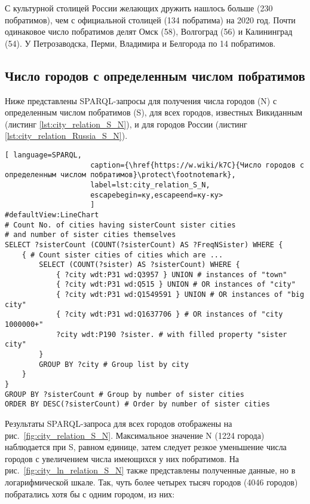 С культурной столицей России желающих дружить нашлось больше (230 побратимов), чем с официальной столицей (134 побратима) на 2020 год. Почти одинаковое число побратимов делят Омск (58), Волгоград (56) и Калининград (54). У Петрозаводска, Перми, Владимира и Белгорода по 14 побратимов.

\subsection{Число городов с определенным числом побратимов}

Ниже представлены SPARQL-запросы для получения числа городов (N) с определенным числом побратимов (S), для всех городов, известных Викиданным (листинг \ref{lst:city_relation_S_N}), и для городов России (листинг \ref{lst:city_relation_Russia_S_N}).

\begin{lstlisting}[ language=SPARQL, 
                    caption={\href{https://w.wiki/k7C}{Число городов с определенным числом побратимов}\protect\footnotemark},
                    label=lst:city_relation_S_N, 
                    escapebegin=ку,escapeend=ку-ку>
                    ]
#defaultView:LineChart
# Count No. of cities having sisterCount sister cities 
# and number of sister cities themselves
SELECT ?sisterCount (COUNT(?sisterCount) AS ?FreqNSister) WHERE {                                                                         
	{ # Count sister cities of cities which are ...
		SELECT (COUNT(?sister) AS ?sisterCount) WHERE {        
			{ ?city wdt:P31 wd:Q3957 } UNION # instances of "town"
			{ ?city wdt:P31 wd:Q515 } UNION # OR instances of "city"
			{ ?city wdt:P31 wd:Q1549591 } UNION # OR instances of "big city"
			{ ?city wdt:P31 wd:Q1637706 } # OR instances of "city 1000000+"
			?city wdt:P190 ?sister. # with filled property "sister city"
		}
		GROUP BY ?city # Group list by city
	}
}
GROUP BY ?sisterCount # Group by number of sister cities                                     
ORDER BY DESC(?sisterCount) # Order by number of sister cities   
\end{lstlisting}

Результаты SPARQL-запроса для всех городов отображены на рис.~\ref{fig:city_relation_S_N}. Максимальное значение N (\num{1224} города) наблюдается при S, равном единице, затем следует резкое уменьшение числа городов с увеличением числа имеющихся у них побратимов. На рис.~\ref{fig:city_ln_relation_S_N} также представлены полученные данные, но в логарифмической шкале. Так, чуть более четырех тысяч городов (\num{4046} городов) побратались хотя бы с одним городом, из них:

